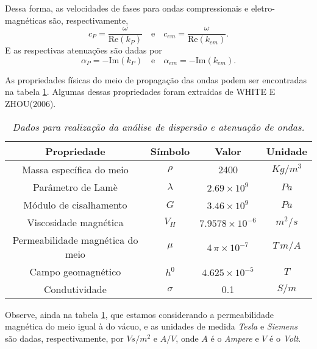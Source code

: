 Dessa forma, as velocidades de fases para ondas compressionais e eletro-magn\'eticas s\~ao, respectivamente,
\begin{equation*}
c_{P}=\frac{\omega}{\text{Re}(k_{P})}\quad\text{e}\quad c_{em}=\frac{\omega}{\text{Re}(k_{em})}.
\end{equation*}
E as respectivas atenua\c{c}\~oes s\~ao dadas por
\begin{equation*}
\alpha_{P}=-\text{Im}(k_{P})\quad\text{e}\quad \alpha_{em}=-\text{Im}(k_{em}).
\end{equation*}

As propriedades f\'isicas do meio de propaga\c{c}\~ao das ondas podem ser encontradas na tabela \ref{tab.dados_dispersao}. Algumas dessas propriedades foram extra\'idas de WHITE E ZHOU(2006).


\begin{table}
\begin{center}
\begin{tabular}{|c|c|c|c|}
\hline 
Propriedade & S\'imbolo & Valor & Unidade \\ 
\hline 
Massa espec\'ifica do meio & $\rho$ & 2400 & $Kg/m^3$ \\ 
\hline 
Par\^ametro de Lam\`e & $\lambda$ & $2.69\times 10^9$ & $Pa$ \\ 
\hline 
M\'odulo de cisalhamento & $G$ & $3.46\times 10^9$ & $Pa$ \\ 
\hline 
Viscosidade magn\'etica & $V_H$ & $7.9578\times 10^{-6}$ & $m^2/s$ \\ 
\hline 
Permeabilidade magn\'etica do meio & $\mu$ & $4\,\pi\times 10^{-7}$ & $T\,m/A$ \\ 
\hline 
Campo geomagn\'etico & $h^0$ & $4.625\times 10^{-5}$ & $T$ \\ 
\hline 
Condutividade & $\sigma$ & 0.1 & $S/m$ \\
\hline
\end{tabular}
\end{center}
\caption{\textit{Dados para realiza\c{c}\~ao da an\'alise de dispers\~ao e atenua\c{c}\~ao de ondas.}}
\label{tab.dados_dispersao}
\end{table}

Observe, ainda na tabela \ref{tab.dados_dispersao}, que estamos considerando a permeabilidade magn\'etica do meio igual \`a do v\'acuo, e as unidades de medida \textit{Tesla} e \textit{Siemens} s\~ao dadas, respectivamente, por $Vs/m^2$ e $A/V$, onde $A$ \'e o \textit{Ampere} e $V$ \'e o \textit{Volt}.